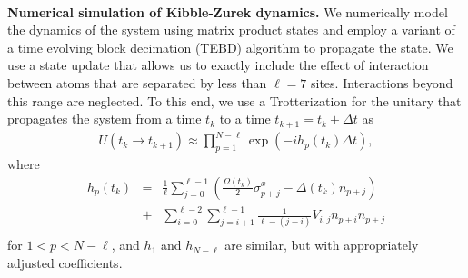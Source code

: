 \documentclass[prl,nobalancelastpage,superscriptaddress,twocolumn,nofootinbib]{revtex4}
\newcommand{\pargap}{\\[12pt]}
\begin{document}
\pargap
\noindent\textbf{Numerical simulation of Kibble-Zurek dynamics.} We numerically model the dynamics of the system using matrix product states and employ a variant of a time evolving block decimation (TEBD) algorithm to propagate the state. We use a state update that allows us to exactly include the effect of interaction between atoms that are separated by less than $\ell=7$ sites. Interactions beyond this range are neglected. To this end, we use a Trotterization for the unitary that propagates the system from a time $t_k$ to a time $t_{k+1}=t_k+\Delta t$ as
\begin{align}
U(t_k\rightarrow t_{k+1})\approx\prod_{p=1}^{N-\ell} \exp\left(-i h_p(t_k) \Delta t\right),
\end{align}
where 
\begin{equation}
\begin{aligned}
  h_p(t_k) &=&\frac{1}{\ell}\sum_{j=0}^{\ell-1}\left(\frac{\Omega(t_k)}{2}\sigma_{p+j}^x-\Delta(t_k)n_{p+j}\right) \\
		   &+&\sum_{i=0}^{\ell-2}\sum_{j=i+1}^{\ell-1}\frac{1}{\ell-(j-i)}V_{i,j}n_{p+i} n_{p+j} \\
\end{aligned}
\end{equation}
for $1<p<N-\ell$, and $h_1$ and $h_{N-\ell}$ are similar, but with appropriately adjusted coefficients. 
\end{document}

